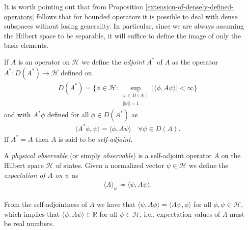 It is worth pointing out that from Proposition \ref{extension-of-densely-defined-operators}
follows that for bounded operators it is possible to deal with dense subspaces without losing
generality. In particular, since we are always assuming the Hilbert space to be separable, it
will suffice to define the image of only the basis elements.

\begin{definition}[Adjoint]
	If $A$ is an operator on $\mathcal{H}$ we define the \textit{adjoint} $A^*$ of $A$ as the
	operator $A^* : D(A^*) \to \mathcal{H}$ defined on
	\begin{align*}
		D(A^*) = \{ \phi \in \mathcal{H} : \sup_{\substack{\psi\in D(A)\\\Vert\psi\Vert=1}}
		|\langle\phi,A\psi\rangle|<\infty \}
	\end{align*}
	and with $A^*\phi$ defined for all $\phi\in D(A^*)$ as
	\begin{align*}
		\langle A^*\phi,\psi \rangle = \langle \phi, A\psi \rangle \quad \forall \psi\in D(A).
	\end{align*}
	If $A^*=A$ then $A$ is said to be \textit{self-adjoint}.
\end{definition}

\begin{definition}[Observable]
	A \textit{physical observable} (or simply \textit{observable}) is a self-adjoint operator
	$A$ on the Hilbert space $\mathcal{H}$ of states. Given a normalized vector $\psi\in
	\mathcal{H}$ we define the \textit{expectation of $A$ on $\psi$} as
	\begin{align*}
		\langle A\rangle_\psi \coloneq \langle\psi,A\psi\rangle.
	\end{align*}
\end{definition}

\begin{remark}
	From the self-adjointness of $A$ we have that  $\langle\psi,A\phi\rangle=\langle A\psi,
	\phi\rangle$ for all $\phi,\psi\in\mathcal{H}$, which implies that
	$\langle\psi,A\psi\rangle\in\mathbb{R}$ for all $\psi\in\mathcal{H}$, i.e., expectation
	values of $A$ must be real numbers.
\end{remark}

